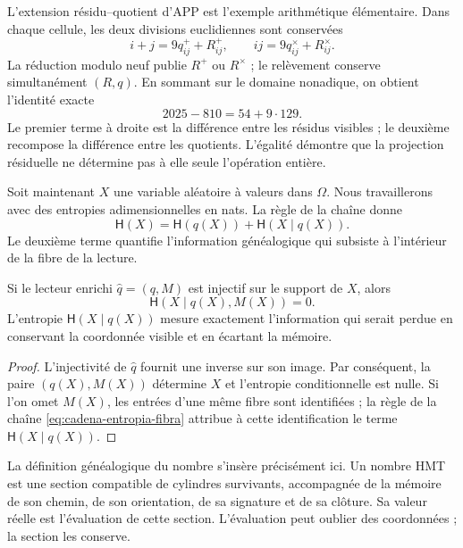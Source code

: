 L'extension résidu--quotient d'APP est l'exemple arithmétique élémentaire. Dans
chaque cellule, les deux divisions euclidiennes sont conservées
\[
 i+j=9q^+_{ij}+R^+_{ij},
 \qquad
 ij=9q^\times_{ij}+R^\times_{ij}.
\]
La réduction modulo neuf publie \(R^+\) ou \(R^\times\) ; le relèvement
conserve simultanément \((R,q)\). En sommant sur le domaine nonadique, on
obtient l'identité exacte
\begin{equation}
 2025-810
 =54+9\cdot129.
 \label{eq:app-residuo-cociente-informacion}
\end{equation}
Le premier terme à droite est la différence entre les résidus visibles ;
le deuxième recompose la différence entre les quotients. L'égalité démontre
que la projection résiduelle ne détermine pas à elle seule l'opération entière.

Soit maintenant \(X\) une variable aléatoire à valeurs dans \(\Omega\). Nous travaillerons
avec des entropies adimensionnelles en nats. La règle de la chaîne donne
\begin{equation}
 \mathsf H(X)
 =\mathsf H(q(X))+\mathsf H(X\mid q(X)).
 \label{eq:cadena-entropia-fibra}
\end{equation}
Le deuxième terme quantifie l'information généalogique qui subsiste à l'intérieur
de la fibre de la lecture.

\begin{theorem}
\label{thm:recuperabilidad-memoria-fibra}
Si le lecteur enrichi \(\widehat q=(q,M)\) est injectif sur le support de
\(X\), alors
\begin{equation}
 \boxed{\mathsf H(X\mid q(X),M(X))=0.}
 \label{eq:entropia-condicional-memoria-cero}
\end{equation}
L'entropie \(\mathsf H(X\mid q(X))\) mesure exactement l'information qui serait
perdue en conservant la coordonnée visible et en écartant la mémoire.
\end{theorem}

\begin{proof}
L'injectivité de \(\widehat q\) fournit une inverse sur son image. Par
conséquent, la paire \((q(X),M(X))\) détermine \(X\) et l'entropie conditionnelle est
nulle. Si l'on omet \(M(X)\), les entrées d'une même fibre sont
identifiées ; la règle de la chaîne \eqref{eq:cadena-entropia-fibra} attribue à
cette identification le terme \(\mathsf H(X\mid q(X))\).
\end{proof}

La définition généalogique du nombre s'insère précisément ici. Un nombre
HMT est une section compatible de cylindres survivants, accompagnée de la mémoire
de son chemin, de son orientation, de sa signature et de sa clôture. Sa valeur réelle est l'évaluation de cette
section. L'évaluation peut oublier des coordonnées ; la section les conserve.

